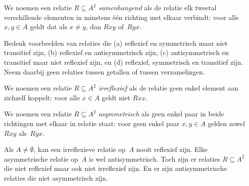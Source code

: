 \documentclass[../../../include/open-logic-section]{subfiles}
\begin{document}
\begin{defn}[Samenhangendheid]
We noemen een relatie $R \subseteq A^2$ \emph{samenhangend} als de
relatie elk tweetal verschillende elementen in minstens één richting
met elkaar verbindt: voor alle $x,y\in A$ geldt dat als $x \neq y$,
dan $Rxy$ of~$Ryx$.
\end{defn}

\begin{prob}
Bedenk voorbeelden van relaties die (a) reflexief en symmetrisch maar
niet transitief zijn, (b) reflexief en antisymmetrisch zijn, (c)
antisymmetrisch en transitief maar niet reflexief zijn, en (d)
reflexief, symmetrisch en transitief zijn. Neem daarbij geen relaties
tussen getallen of tussen verzamelingen.
\end{prob} 
 
\begin{defn}[Irreflexiviteit]
We noemen een relatie $R \subseteq A^2$ \emph{irreflexief} als de
relatie geen enkel element aan zichzelf koppelt: voor alle
$x \in A$ geldt niet $Rxx$.
\end{defn}

\begin{defn}[Asymmetrie]
We noemen een relatie $R \subseteq A^2$ \emph{asymmetrisch} als geen
enkel paar in beide richtingen met elkaar in relatie staat: voor geen
enkel paar $x,y\in A$ gelden zowel $Rxy$ als~$Ryx$.
\end{defn}

Als $A \neq \emptyset$, kan een irreflexieve relatie op~$A$ nooit
reflexief zijn. Elke asymmetrische relatie op~$A$ is wel
antisymmetrisch. Toch zijn er relaties $R \subseteq A^2$ die niet
reflexief maar ook niet irreflexief zijn. En er zijn antisymmetrische
relaties die niet asymmetrisch zijn.
\end{document}
